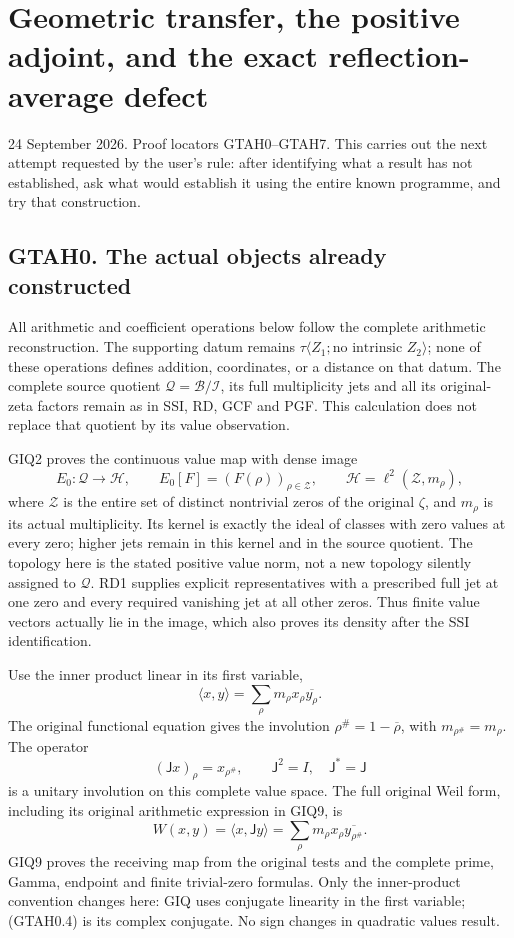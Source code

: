 \section{Geometric transfer, the positive adjoint, and the exact
reflection-average
defect}\label{geometric-transfer-the-positive-adjoint-and-the-exact-reflection-average-defect}

24 September 2026. Proof locators GTAH0--GTAH7. This carries out the
next attempt requested by the user's rule: after identifying what a
result has not established, ask what would establish it using the entire
known programme, and try that construction.

\subsection{GTAH0. The actual objects already
constructed}\label{gtah0.-the-actual-objects-already-constructed}

All arithmetic and coefficient operations below follow the complete
arithmetic reconstruction. The supporting datum remains
\(\tau\langle Z_1;\text{no intrinsic }Z_2\rangle\); none of these
operations defines addition, coordinates, or a distance on that datum.
The complete source quotient \(\mathcal Q=\mathcal B/\mathcal I\), its
full multiplicity jets and all its original-zeta factors remain as in
SSI, RD, GCF and PGF. This calculation does not replace that quotient by
its value observation.

GIQ2 proves the continuous value map with dense image \[
E_0:\mathcal Q\longrightarrow\mathcal H,
\qquad E_0[F]=(F(\rho))_{\rho\in\mathscr Z},
\qquad
\mathcal H=\ell^2(\mathscr Z,m_\rho),
\tag{GTAH0.1}
\] where \(\mathscr Z\) is the entire set of distinct nontrivial zeros
of the original \(\zeta\), and \(m_\rho\) is its actual multiplicity.
Its kernel is exactly the ideal of classes with zero values at every
zero; higher jets remain in this kernel and in the source quotient. The
topology here is the stated positive value norm, not a new topology
silently assigned to \(\mathcal Q\). RD1 supplies explicit
representatives with a prescribed full jet at one zero and every
required vanishing jet at all other zeros. Thus finite value vectors
actually lie in the image, which also proves its density after the SSI
identification.

Use the inner product linear in its first variable, \[
\langle x,y\rangle=\sum_\rho m_\rho x_\rho\overline{y_\rho}.
\tag{GTAH0.2}
\] The original functional equation gives the involution
\(\rho^\#=1-\overline\rho\), with \(m_{\rho^\#}=m_\rho\). The operator
\[
(\mathsf Jx)_\rho=x_{\rho^\#},\qquad
\mathsf J^2=I,\quad\mathsf J^*=\mathsf J
\tag{GTAH0.3}
\] is a unitary involution on this complete value space. The full
original Weil form, including its original arithmetic expression in
GIQ9, is \[
W(x,y)=\langle x,\mathsf Jy\rangle
=\sum_\rho m_\rho x_\rho\overline{y_{\rho^\#}}.
\tag{GTAH0.4}
\] GIQ9 proves the receiving map from the original tests and the
complete prime, Gamma, endpoint and finite trivial-zero formulas. Only
the inner-product convention changes here: GIQ uses conjugate linearity
in the first variable; (GTAH0.4) is its complex conjugate. No sign
changes in quadratic values result.

